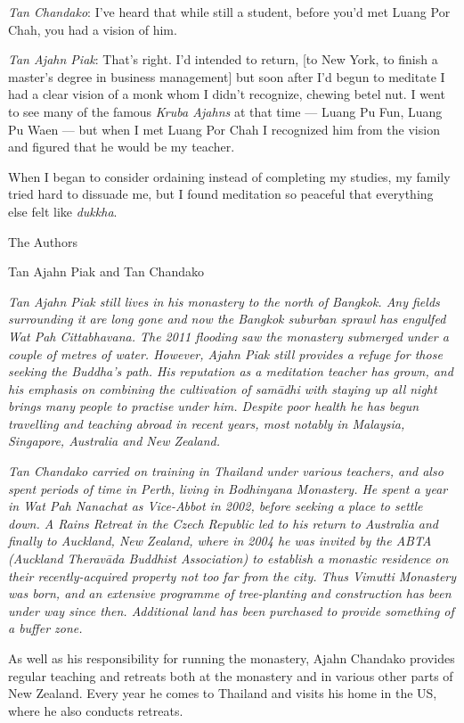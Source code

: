 \emph{Tan Chandako}: I've heard that while still a student, before you'd
met Luang Por Chah, you had a vision of him.

\emph{Tan Ajahn Piak}: That's right. I'd intended to return, {[}to New
York, to finish a master's degree in business management{]} but soon
after I'd begun to meditate I had a clear vision of a monk whom I didn't
recognize, chewing betel nut. I went to see many of the famous
\emph{Kruba Ajahns  } at that time --- Luang Pu Fun, Luang Pu Waen ---
but when I met Luang Por Chah I recognized him from the vision and
figured that he would be my teacher.

When I began to consider ordaining instead of completing my studies, my
family tried hard to dissuade me, but I found meditation so peaceful
that everything else felt like \emph{dukkha}.



The Authors

Tan Ajahn Piak and Tan Chandako

\emph{Tan Ajahn Piak still lives in his monastery to the north of
Bangkok. Any fields surrounding it are long gone and now the Bangkok
suburban sprawl has engulfed Wat Pah Cittabhavana. The 2011 flooding saw
the monastery submerged under a couple of metres of water. However,
Ajahn Piak still provides a refuge for those seeking the Buddha's path.
His reputation as a meditation teacher has grown, and his emphasis on
combining the cultivation of samādhi with staying up all night brings
many people to practise under him. Despite poor health he has begun
travelling and teaching abroad in recent years, most notably in
Malaysia, Singapore, Australia and New Zealand.}

\emph{Tan Chandako carried on training in Thailand under various
teachers, and also spent periods of time in Perth, living in Bodhinyana
Monastery. He spent a year in Wat Pah Nanachat as Vice-Abbot in 2002,
before seeking a place to settle down. A Rains Retreat in the Czech
Republic led to his return to Australia and finally to Auckland, New
Zealand, where in 2004 he was invited by the ABTA (Auckland Theravāda 
Buddhist Association) to establish a monastic residence on their
recently-acquired property not too far from the city. Thus Vimutti
Monastery was born, and an extensive programme of tree-planting and
construction has been under way since then. Additional land has been
purchased to provide something of a buffer zone.}

As well as his responsibility for running the monastery, Ajahn Chandako
provides regular teaching and retreats both at the monastery and in
various other parts of New Zealand. Every year he comes to Thailand and
visits his home in the US, where he also conducts retreats.

